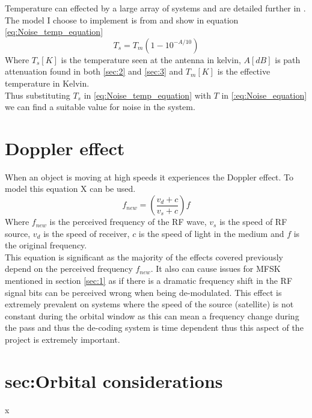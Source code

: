 \documentclass[conference]{IEEEtran}
\begin{document}
Temperature can effected by a large array of systems and are detailed further in \cite{ITU-R_P.372-16}. The model I choose to implement is from \cite{ITU-R_P.618-7} and show in equation \ref{eq:Noise_temp_equation}
\begin{equation}
T_s = T_m(1-10^{-A/10})
\label{eq:Noise_temp_equation}
\end{equation}
Where $T_s[K]$ is the temperature seen at the antenna in kelvin, $A[dB]$ is path attenuation found in both \ref{sec:2} and \ref{sec:3} and $T_m [K]$ is the effective temperature in Kelvin.\\

Thus substituting $T_s$ in \ref{eq:Noise_temp_equation} with $T$ in \ref{:eq:Noise_equation} we can find a suitable value for noise in the system.

\label{sec:5}


\section{Doppler effect}
When an object is moving at high speeds it experiences the Doppler effect. To model this equation X can be used. 
\begin{equation}
f_{new} =(\frac{v_d+c}{v_s+c})f
\label{eq:Doppler_effect_equation}
\end{equation}
Where $f_{new}$ is the perceived frequency of the RF wave, $v_s$ is the speed of RF source, $v_d$ is the speed of receiver, $c$ is the speed of light in the medium and $f$ is the original frequency.\\

This equation is significant as the majority of the effects covered previously depend on the perceived frequency $f_{new}$. It also can cause issues for MFSK mentioned in section \ref{sec:1} as if there is a dramatic frequency shift in the RF signal bits can be perceived wrong when being de-modulated. This effect is extremely prevalent on systems where the speed of the source (satellite) is not constant during the orbital window as this can mean a frequency change during the pass and thus the de-coding system is time dependent thus this aspect of the project is extremely important.
\label{sec:6}

\section{sec:Orbital considerations}
x
\label{sec:7}


\end{document}
